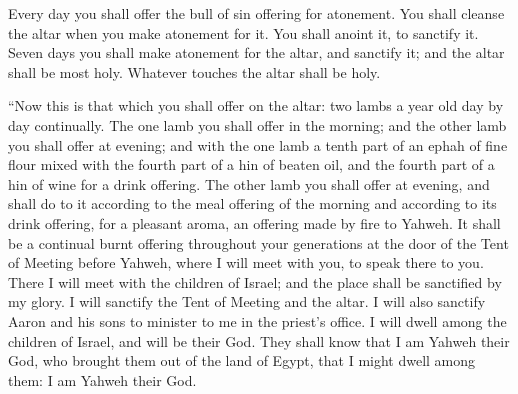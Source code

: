 {Every day you shall offer the bull of sin offering for atonement. You shall cleanse the altar when you make atonement for it. You shall anoint it, to sanctify it.
Seven days you shall make atonement for the altar, and sanctify it; and the altar shall be most holy. Whatever touches the altar shall be holy.
\par }{\PP {}“Now this is that which you shall offer on the altar: two lambs a year old day by day continually.
The one lamb you shall offer in the morning; and the other lamb you shall offer at evening;
and with the one lamb a tenth part of an ephah of fine flour mixed with the fourth part of a hin of beaten oil, and the fourth part of a hin of wine for a drink offering.
The other lamb you shall offer at evening, and shall do to it according to the meal offering of the morning and according to its drink offering, for a pleasant aroma, an offering made by fire to Yahweh.
It shall be a continual burnt offering throughout your generations at the door of the Tent of Meeting before Yahweh, where I will meet with you, to speak there to you.
There I will meet with the children of Israel; and the place shall be sanctified by my glory.
I will sanctify the Tent of Meeting and the altar. I will also sanctify Aaron and his sons to minister to me in the priest’s office.
I will dwell among the children of Israel, and will be their God.
They shall know that I am Yahweh their God, who brought them out of the land of Egypt, that I might dwell among them: I am Yahweh their God.

}
